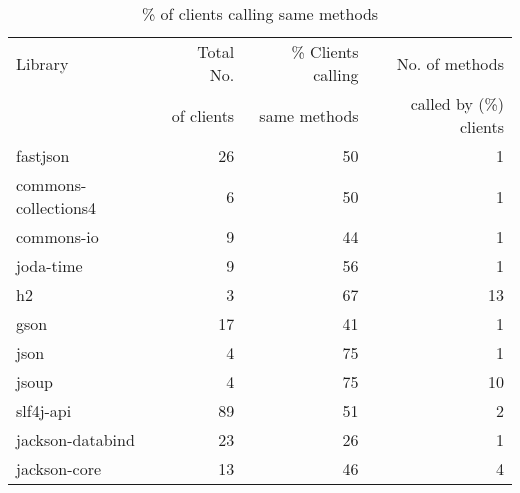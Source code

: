 \begin{table}[ht]
\centering
\begingroup\small
\begin{tabular}{l!{\color{verylightgray}\vrule}rrr}
Library & Total No.  & \% Clients calling  & No. of methods  \\ 
 & of clients & same methods & called by (\%) clients \\
   \hline
fastjson & 26 & 50 & 1 \\ 
  commons-collections4 & 6 & 50 & 1 \\ 
  commons-io & 9 & 44 & 1 \\ 
  joda-time & 9 & 56 & 1 \\ 
  h2 & 3 & 67 & 13 \\ 
  gson & 17 & 41 & 1 \\ 
  json & 4 & 75 & 1 \\ 
  jsoup & 4 & 75 & 10 \\ 
  slf4j-api & 89 & 51 & 2 \\ 
  jackson-databind & 23 & 26 & 1 \\ 
  jackson-core & 13 & 46 & 4 \\ 
\end{tabular}
\endgroup
\caption{\label{tab:same-method}\% of clients calling same methods} 
\end{table}
